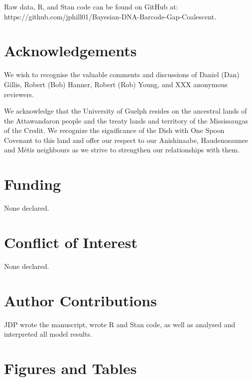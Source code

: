 \documentclass[12pt]{article}
\begin{document}
Raw data, R, and Stan code can be found on GitHub at: \\ https://github.com/jphill01/Bayesian-DNA-Barcode-Gap-Coalescent.

\section*{Acknowledgements}

We wish to recognise the valuable comments and discussions of Daniel (Dan) Gillis, Robert (Bob) Hanner, Robert (Rob) Young, and XXX anonymous reviewers.

We acknowledge that the University of Guelph resides on the ancestral lands of the Attawandaron people and the treaty lands and territory of the Mississaugas of the Credit. We recognize the significance of the Dish with One Spoon Covenant to this land and offer our respect to our Anishinaabe, Haudenosaunee and M{\'e}tis neighbours as we strive to strengthen our relationships with them.

\section*{Funding}

None declared.

\section*{Conflict of Interest}

None declared.

\section*{Author Contributions}

JDP wrote the manuscript, wrote R and Stan code, as well as analysed and interpreted all model results. 




\newpage

\section*{Figures and Tables}
\end{document}
